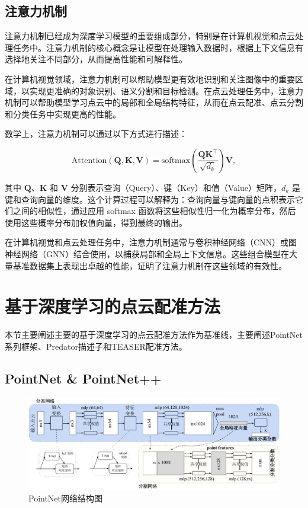 \subsection{注意力机制}
注意力机制已经成为深度学习模型的重要组成部分，特别是在计算机视觉和点云处理任务中。注意力机制的核心概念是让模型在处理输入数据时，根据上下文信息有选择地关注不同部分，从而提高性能和可解释性。

在计算机视觉领域，注意力机制可以帮助模型更有效地识别和关注图像中的重要区域，以实现更准确的对象识别、语义分割和目标检测。在点云处理任务中，注意力机制可以帮助模型学习点云中的局部和全局结构特征，从而在点云配准、点云分割和分类任务中实现更高的性能。

数学上，注意力机制可以通过以下方式进行描述：

\begin{equation}
\text{Attention}(\boldsymbol{Q}, \boldsymbol{K}, \boldsymbol{V}) = \text{softmax}(\frac{\boldsymbol{Q}\boldsymbol{K}^\top}{\sqrt{d_k}})\boldsymbol{V},
\end{equation}

其中 $\boldsymbol{Q}$、$\boldsymbol{K}$ 和 $\boldsymbol{V}$ 分别表示查询（Query）、键（Key）和值（Value）矩阵，$d_k$ 是键和查询向量的维度。这个计算过程可以解释为：查询向量与键向量的点积表示它们之间的相似性，通过应用 softmax 函数将这些相似性归一化为概率分布，然后使用这些概率分布加权值向量，得到最终的输出。

在计算机视觉和点云处理任务中，注意力机制通常与卷积神经网络（CNN）或图神经网络（GNN）结合使用，以捕获局部和全局上下文信息。这些组合模型在大量基准数据集上表现出卓越的性能，证明了注意力机制在这些领域的有效性。


\section{基于深度学习的点云配准方法}
本节主要阐述主要的基于深度学习的点云配准方法作为基准线，主要阐述PointNet\cite{qi2017pointnet, qi2017pointnet++}系列框架、Predator\cite{huang2021predator}描述子和TEASER\cite{yang2020teaser}配准方法。

\subsection{PointNet \& PointNet++}
\begin{figure}
    \centering
    \includegraphics[width=\linewidth]{images/pointnet.pdf}
    \caption{PointNet\cite{qi2017pointnet}网络结构图}
    \label{fig:pointnet}
    \vspace{-5mm}
\end{figure}

